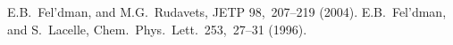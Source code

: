 \begin{thebibliography}{}
%
%
%
E.B.~Fel’dman, and M.G.~Rudavets, JETP 98,~207–219 (2004).
%
E.B.~Fel’dman, and S.~Lacelle, Chem.~Phys.~Lett.~253,~27–31 (1996).
%
%
%
%
%
%

\end{thebibliography}

